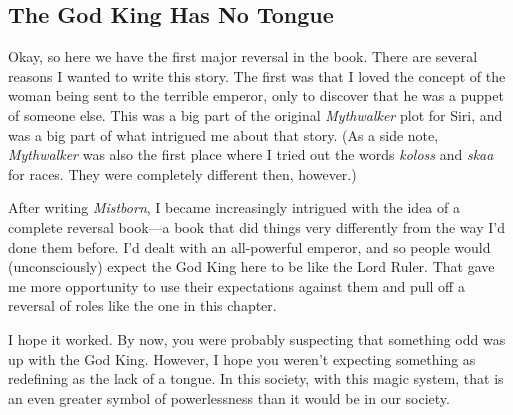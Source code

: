 \subsection*{The God King Has No Tongue}

Okay, so here we have the first major reversal in the book. There are several reasons I wanted to write this story. The first was that I loved the concept of the woman being sent to the terrible emperor, only to discover that he was a puppet of someone else. This was a big part of the original \textit{Mythwalker} plot for Siri, and was a big part of what intrigued me about that story. (As a side note, \textit{Mythwalker} was also the first place where I tried out the words \textit{koloss} and \textit{skaa} for races. They were completely different then, however.)

After writing \textit{Mistborn}, I became increasingly intrigued with the idea of a complete reversal book—a book that did things very differently from the way I’d done them before. I’d dealt with an all-powerful emperor, and so people would (unconsciously) expect the God King here to be like the Lord Ruler. That gave me more opportunity to use their expectations against them and pull off a reversal of roles like the one in this chapter.

I hope it worked. By now, you were probably suspecting that something odd was up with the God King. However, I hope you weren’t expecting something as redefining as the lack of a tongue. In this society, with this magic system, that is an even greater symbol of powerlessness than it would be in our society.



